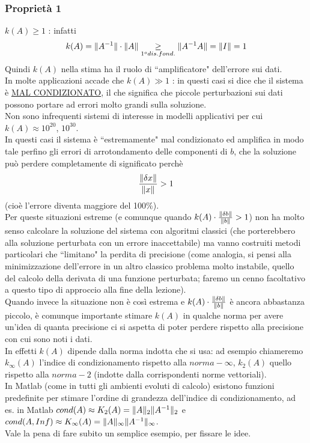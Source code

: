 \documentclass[12pt,a4paper]{article}
\DeclarePairedDelimiter{\norma}{\lVert}{\rVert}
\begin{document}
\subsubsection{Proprietà 1}
$k(A)\geq1$ : infatti
\begin{equation*}
    k(A)=\norma{A^{-1}}\cdot\norma{A}\underset{1^o dis. fond.}{\geq}\norma{A^{-1}A}=\norma{I}=1
\end{equation*}
Quindi $k(A)$ nella stima ha il ruolo di ``amplificatore" dell'errore sui dati.\\ In molte applicazioni accade che $k(A) \gg 1$ : in questi casi si dice che il sistema è \uline{MAL CONDIZIONATO}, il che significa che piccole perturbazioni sui dati possono portare ad errori molto grandi sulla soluzione.\\
Non sono infrequenti sistemi di interesse in modelli applicativi per cui $k(A)\approx10^{20}$, $10^{30}$.\\In questi casi il sistema è ``estremamente" mal condizionato ed amplifica in modo tale perfino gli errori di arrotondamento delle componenti di $b$, che la soluzione può perdere completamente di significato perchè
\begin{equation*}
    \frac{\norma{\delta x}}{\norma{x}}>1
\end{equation*}
(cioè l'errore diventa maggiore del 100\%).\\Per queste situazioni estreme (e comunque quando $k(A)\cdot\frac{\norma{\delta b}}{\norma{b}}>1$) non ha molto senso calcolare la soluzione del sistema con algoritmi classici (che porterebbero alla soluzione perturbata con un errore inaccettabile) ma vanno costruiti metodi particolari che ``limitano" la perdita di precisione (come analogia, si pensi alla minimizzazione dell'errore in un altro classico problema molto instabile, quello del calcolo della derivata di una funzione perturbata; faremo un cenno facoltativo a questo tipo di approccio alla fine della lezione).\\Quando invece la situazione non è così estrema e $k(A)\cdot\frac{\norma{\delta b}}{\norma{b}}$ è ancora abbastanza piccolo, è comunque importante stimare $k(A)$ in qualche norma per avere un'idea di quanta precisione ci si aspetta di poter perdere rispetto alla precisione con cui sono noti i dati.\\In effetti $k(A)$ dipende dalla norma indotta che si usa: ad esempio chiameremo $k_\infty(A)$ l'indice di condizionamento rispetto alla $norma-\infty$, $k_2(A)$ quello rispetto alla $norma-2$ (indotte dalla corrispondenti norme vettoriali).\\In Matlab (come in tutti gli ambienti evoluti di calcolo) esistono funzioni predefinite per stimare l'ordine di grandezza dell'indice di condizionamento, ad es. in Matlab $cond(A) \approx K_2(A) = \norma{A}_2 \norma{A^{-1}}_2$ e $cond(A,Inf) \approx K_\infty(A) = \norma{A}_\infty \norma{A^{-1}}_\infty$.\\
Vale la pena di fare subito un semplice esempio, per fissare le idee.
\end{document}
